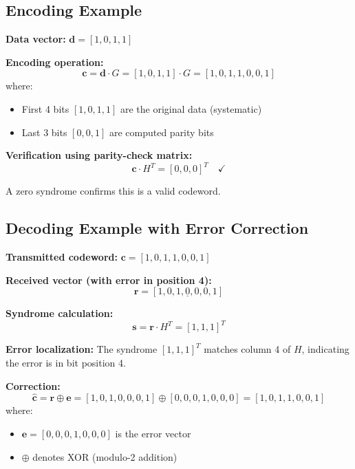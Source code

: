 \subsection{Encoding Example}

\textbf{Data vector:} $\mathbf{d} = [1, 0, 1, 1]$

\textbf{Encoding operation:}
\begin{equation}
\mathbf{c} = \mathbf{d} \cdot G = [1, 0, 1, 1] \cdot G = [1, 0, 1, 1, 0, 0, 1]
\end{equation}
where:
\begin{itemize}
\item First 4 bits $[1, 0, 1, 1]$ are the original data (systematic)
\item Last 3 bits $[0, 0, 1]$ are computed parity bits
\end{itemize}

\textbf{Verification using parity-check matrix:}
\begin{equation}
\mathbf{c} \cdot H^T = [0, 0, 0]^T \quad \checkmark
\end{equation}

A zero syndrome confirms this is a valid codeword.

\subsection{Decoding Example with Error Correction}

\textbf{Transmitted codeword:} $\mathbf{c} = [1, 0, 1, 1, 0, 0, 1]$

\textbf{Received vector (with error in position 4):} 
\begin{equation}
\mathbf{r} = [1, 0, 1, \underline{0}, 0, 0, 1]
\end{equation}

\textbf{Syndrome calculation:}
\begin{equation}
\mathbf{s} = \mathbf{r} \cdot H^T = [1, 1, 1]^T
\end{equation}

\textbf{Error localization:} The syndrome $[1, 1, 1]^T$ matches column 4 of $H$, indicating the error is in bit position 4.

\textbf{Correction:}
\begin{equation}
\hat{\mathbf{c}} = \mathbf{r} \oplus \mathbf{e} = [1, 0, 1, 0, 0, 0, 1] \oplus [0, 0, 0, 1, 0, 0, 0] = [1, 0, 1, 1, 0, 0, 1]
\end{equation}
where:
\begin{itemize}
\item $\mathbf{e} = [0, 0, 0, 1, 0, 0, 0]$ is the error vector
\item $\oplus$ denotes XOR (modulo-2 addition)
\end{itemize}

